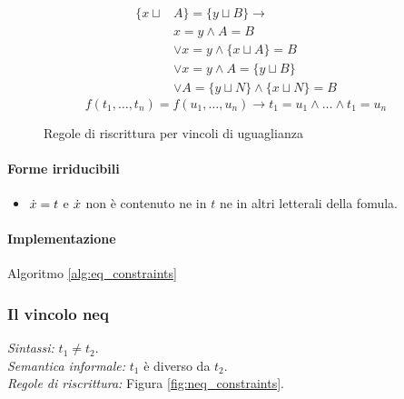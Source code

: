 \documentclass[12pt,a4paper,openright]{book} %
\begin{document}
\begin{figure}
\begin{tcolorbox}[colframe=black, colback=white, sharp corners]
\begin{equation}
\begin{split}
		\end{split}
		\end{equation}
		\begin{equation}
		\begin{split}
		\{ x \sqcup & A \} = \{ y \sqcup B \} \to \\
		& x = y \land A = B \\
		& \lor x = y \land \{ x \sqcup A \} = B \\
		& \lor x = y \land A = \{ y \sqcup B \} \\
		& \lor A = \{ y \sqcup N \} \land \{ x \sqcup N \} = B
		\end{split}
		\end{equation}
		\begin{equation}
		f(t_1, \ldots, t_n) = f(u_1, \ldots, u_n) \to t_1 = u_1 \land \ldots \land t_1 = u_n
		\end{equation}

	\end{tcolorbox}

	\caption{Regole di riscrittura per vincoli di uguaglianza}
	\label{fig:eq_constraints}
\end{figure}

\paragraph{Forme irriducibili}
\begin{itemize}
	\item $\dot{x} = t$ e $\dot{x}$ non è contenuto ne in $t$ ne in
          altri letterali della fomula.
\end{itemize}

\paragraph{Implementazione}
Algoritmo \ref{alg:eq_constraints}

\subsubsection{Il vincolo neq}

\textit{Sintassi:} $t_1 \neq t_2$.\\
\noindent\textit{Semantica informale:} $t_1$ è diverso da $t_2$.\\
\noindent\textit{Regole di riscrittura:} Figura \ref{fig:neq_constraints}.
\end{document}
